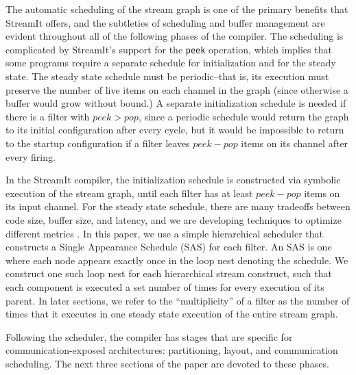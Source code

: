 The automatic scheduling of the stream graph is one of the primary
benefits that StreamIt offers, and the subtleties of scheduling and
buffer management are evident throughout all of the following phases
of the compiler.  The scheduling is complicated by StreamIt's support
for the {\tt peek} operation, which implies that some programs require
a separate schedule for initialization and for the steady state.  The
steady state schedule must be periodic--that is, its execution must
preserve the number of live items on each channel in the graph (since
otherwise a buffer would grow without bound.)  A separate
initialization schedule is needed if there is a filter with $peek >
pop$, since a periodic schedule would return the graph to its initial
configuration after every cycle, but it would be impossible to return
to the startup configuration if a filter leaves $peek-pop$ items on
its channel after every firing.

In the StreamIt compiler, the initialization schedule is constructed
via symbolic execution of the stream graph, until each filter has at
least $peek-pop$ items on its input channel.  For the steady state
schedule, there are many tradeoffs between code size, buffer size, and
latency, and we are developing techniques to optimize different
metrics \cite{streamittech2}.  In this paper, we use a simple
hierarchical scheduler that constructs a Single Appearance Schedule
(SAS) \cite{leesdf} for each filter.  An SAS is one where each node
appears exactly once in the loop nest denoting the schedule.  We
construct one such loop nest for each hierarchical stream construct,
such that each component is executed a set number of times for every
execution of its parent.  In later sections, we refer to the
``multiplicity'' of a filter as the number of times that it executes
in one steady state execution of the entire stream graph.

Following the scheduler, the compiler has stages that are specific for
communication-exposed architectures: partitioning, layout, and
communication scheduling.  The next three sections of the paper are
devoted to these phases.



